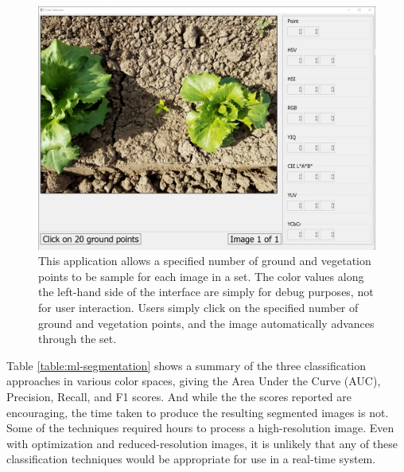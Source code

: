 \documentclass[letterpaper]{report}
\begin{document}
{\begin{figure}[H]
	\centering
	\includegraphics[scale=0.30]{./figures/color-screenshot.png}
	\caption[Color sampling UI]{This application allows a specified number of ground and vegetation points to be sample for each image in a set. The color values along the left-hand side of the interface are simply for debug purposes, not for user interaction. Users simply click on the specified number of ground and vegetation points, and the image automatically advances through the set.}
	\label{fig:color-application}
\end{figure}

%

Table \ref{table:ml-segmentation} shows a summary of the three classification approaches in various color spaces, giving the Area Under the Curve (AUC), Precision, Recall, and F1 scores. And while the the scores reported are encouraging, the time taken to produce the resulting segmented images is not. Some of the techniques required hours to process a high-resolution image. Even with optimization and reduced-resolution images, it is unlikely that any of these classification techniques would be appropriate for use in a real-time system.

{
\renewcommand*{\arraystretch}{0.89}

%


}}
\end{document}

